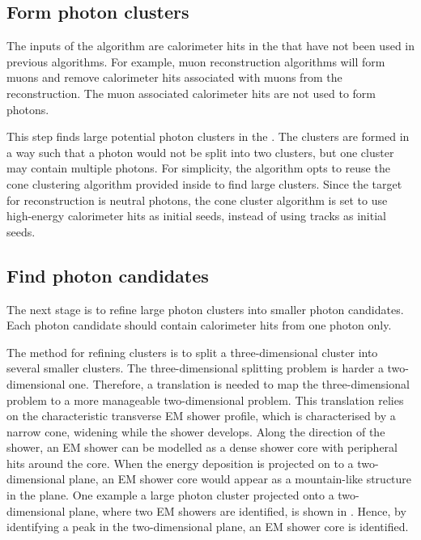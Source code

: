 \subsection{Form photon clusters}

The inputs of the \PhotonReconstruction algorithm are calorimeter hits in the \ECAL that have not been used in previous algorithms. For example, muon reconstruction algorithms will form muons and remove calorimeter hits associated with muons from the reconstruction. The muon associated calorimeter hits are not used to form photons.

This step finds large potential photon clusters in the \ECAL. The clusters are formed in a way such that a photon would not be split into two clusters, but one cluster may contain multiple photons. For simplicity, the algorithm opts to reuse  the cone clustering algorithm  provided inside \pandora to find large clusters.  Since the target for reconstruction is neutral photons, the cone cluster algorithm is set to use high-energy \ECAL calorimeter hits as initial seeds, instead of using tracks as initial seeds.  %

\subsection{Find photon candidates}
\label{sec:photonCandiate}

The next stage is to refine large photon clusters into smaller photon candidates. Each photon candidate should contain calorimeter hits from one photon only.

The method for refining clusters is to split a three-dimensional cluster into several smaller clusters. The three-dimensional splitting problem is harder a two-dimensional one. Therefore, a translation is needed to map the three-dimensional problem to a more manageable two-dimensional problem. This translation relies on the characteristic  transverse EM shower profile, which is characterised by a narrow cone, widening while the shower develops. Along the direction of the shower, an  EM shower can be modelled as a dense shower core with peripheral hits around the core. When the energy deposition is projected on to a two-dimensional plane, an EM shower core would appear as a mountain-like structure in the plane. One example  a large photon cluster projected onto a two-dimensional plane, where two EM showers are identified, is shown in . Hence, by identifying a peak in the two-dimensional plane, an EM shower core is identified.

